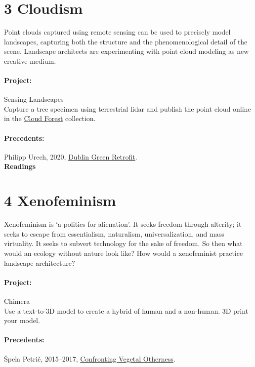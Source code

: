 \documentclass[11pt,article,oneside]{memoir}
\begin{document}
\section{3 Cloudism}

Point clouds captured using remote sensing
can be used to precisely model landscapes,
capturing both the structure
and the phenomenological detail
of the scene.
Landscape architects are experimenting
with point cloud modeling
as new creative medium.

\paragraph{Project:} Sensing Landscapes \\

\noindent
Capture a tree specimen using terrestrial lidar
and publish the point cloud online in the 
\href{https://xyz.cct.lsu.edu/cloud-forest/}{Cloud Forest} collection.

\paragraph{Precedents:} 
Philipp Urech, 2020, \href{https://skfb.ly/oRCrE}{Dublin Green Retrofit}.
\\

\noindent
\textbf{Readings}
\nocite{*}
\setlength{}
\printbibliography[keyword=cloudism, heading=none]

\section{4 Xenofeminism}

Xenofeminism is `a politics for alienation'.
It seeks freedom through alterity; 
it seeks to escape from
essentialism, naturalism, universalization, and mass virtuality.
It seeks to subvert technology for the sake of freedom. 
So then what would an ecology without nature look like?
How would a xenofeminist practice landscape architecture?

\paragraph{Project:} Chimera \\

\noindent
Use a text-to-3D model to create a hybrid of human and a non-human.
3D print your model. 

\paragraph{Precedents:} 
Špela Petrič, 2015--2017, \href{https://www.spelapetric.org/}{Confronting Vegetal Otherness}.
\\
\end{document}
